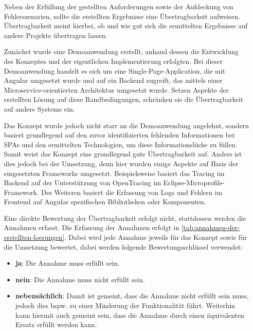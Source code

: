 
Neben der Erfüllung der gestellten Anforderungen sowie der Aufdeckung von Fehlerszenarien, sollte die erstellten Ergebnisse eine Übertragbarkeit aufweisen. Übertragbarkeit meint hierbei, ob und wie gut sich die ermittelten Ergebnisse auf andere Projekte übertragen lassen.

Zunächst wurde eine Demoanwendung erstellt, anhand dessen die Entwicklung des Konzeptes und der eigentlichen Implementierung erfolgten. Bei dieser Demoanwendung handelt es sich um eine Single-Page-Application, die mit Angular umgesetzt wurde und auf ein Backend zugreift, das mittels einer Microservice-orientierten Architektur umgesetzt wurde. Setzen Aspekte der erstellten Lösung auf diese Randbedingungen, schränken sie die Übertragbarkeit auf andere Systeme ein.

Das Konzept wurde jedoch nicht starr an die Demoanwendung angelehnt, sondern basiert grundlegend auf den zuvor identifizierten fehlenden Informationen bei SPAs und den ermittelten Technologien, um diese Informationslücke zu füllen. Somit weist das Konzept eine grundlegend gute Übertragbarkeit auf. Anders ist dies jedoch bei der Umsetzung, denn hier wurden einige Aspekte auf Basis der eingesetzten Frameworks umgesetzt. Beispielsweise basiert das Tracing im Backend auf der Unterstützung von OpenTracing im Eclipse-Microprofile-Framework. Des Weiteren basiert die Erfassung von Logs und Fehlern im Frontend auf Angular spezifischen Bibliotheken oder Komponenten.

Eine direkte Bewertung der Übertragbarkeit erfolgt nicht, stattdessen werden die Annahmen erfasst. Die Erfassung der Annahmen erfolgt in \autoref{tab:annahmen-der-erstellten-loesungen}. Dabei wird jede Annahme jeweils für das Konzept sowie für die Umsetzung bewertet, dabei werden folgende Bewertungsschlüssel verwendet:

\begin{itemize}
	\item \textbf{ja}: Die Annahme muss erfüllt sein.
	\item \textbf{nein}: Die Annahme muss nicht erfüllt sein.
	\item \textbf{nebensächlich}: Damit ist gemeint, dass die Annahme nicht erfüllt sein muss, jedoch dies bspw. zu einer Minderung der Funktionalität führt. Weiterhin kann hiermit auch gemeint sein, dass die Annahme durch einen äquivalenten Ersatz erfüllt werden kann.
\end{itemize}

